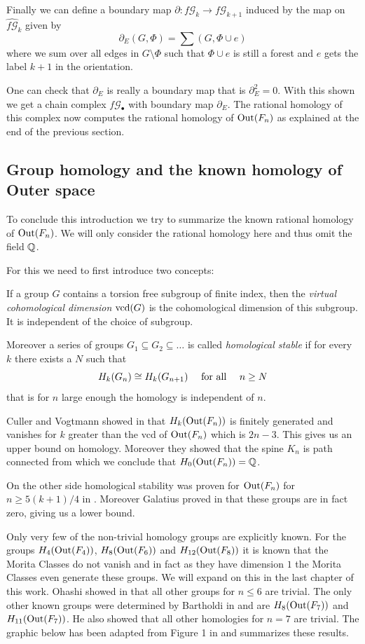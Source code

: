 Finally we can define a boundary map  $\partial: f\mathcal{G}_{k} \to f\mathcal{G}_{k+1}$ induced by the map on $\widehat{f \mathcal{G}}_{k}$ given by
\[
	\partial_{E}(G,\Phi) = \sum (G,\Phi \cup e)
\] 
where we sum over all edges in $G \setminus \Phi$ such that $\Phi \cup e$ is still a forest and 
$e$ gets the label $k+1$ in the orientation.

One can check that $\partial_{E}$ is really a boundary map that is $\partial_{E}^2 = 0$.
With this shown we get a chain complex $f\mathcal{G}_{\bullet}$ with boundary map $\partial_{E}$.
The rational homology of this complex now computes the rational homology of $\operatorname{Out}(F_{n})$ as
explained at the end of the previous section.


\subsection{Group homology and the known homology of Outer space}
To conclude this introduction we try to summarize the known rational homology of $\operatorname{Out}(F_{n})$.
We will only consider the rational homology here and thus omit the field $\mathbb{Q}$.

For this we need to first introduce two concepts:
\begin{definition}
	If a group $G$ contains a torsion free subgroup of finite index, then the \emph{virtual cohomological dimension} $\operatorname{vcd}(G)$
is the cohomological dimension of this subgroup. It is independent of the choice of subgroup.

Moreover a series of groups $G_1 \subseteq G_2 \subseteq \ldots$ is called \emph{homological stable} if for every $k$ 
there exists a $N$ such that 
\[
	H_{k}(G_{n}) \cong H_{k}(G_{n+1}) \qq{ for all } n \geq N
\]
that is for $n$ large enough the homology is independent of  $n$.
\end{definition}

Culler and Vogtmann showed in \cite{vogtmann86} that $H_{k}(\operatorname{Out}(F_{n}))$ is finitely generated and vanishes for $k$ greater
than the vcd of $\operatorname{Out}(F_{n})$ which is $2n -3$. This gives us an upper bound on homology.
Moreover they showed that the spine $K_{n}$ is path connected from which we conclude that $H_0(\operatorname{Out}(F_{n})) = \mathbb{Q}$.

On the other side homological stability was proven for $\operatorname{Out}(F_{n})$ for $n \geq 5 (k+1) / 4$ in \cite{hatcher98,hatcher04}.
Moreover Galatius proved in \cite{galatius11} that these groups are in fact zero, giving us a lower bound.

Only very few of the non-trivial homology groups are explicitly known.
For the groups $H_{4}(\operatorname{Out}(F_{4}))$, $H_{8}(\operatorname{Out}(F_{6}))$ and $H_{12}(\operatorname{Out}(F_{8}))$ it is known 
that the Morita Classes do not vanish and in fact as they have dimension $1$ the Morita Classes even generate these groups.
We will expand on this in the last chapter of this work.
Ohashi showed in \cite{ohashi08} that all other groups for $n \leq 6$ are trivial. 
The only other known groups were determined by Bartholdi in \cite{bartholdi16} and are
$H_{8}(\operatorname{Out}(F_{7}))$ and $H_{11}(\operatorname{Out}(F_{7}))$. He also showed that all other homologies for $n = 7$ are trivial.
The graphic below has been adapted from Figure 1 in \cite{conant16} and summarizes these results.

